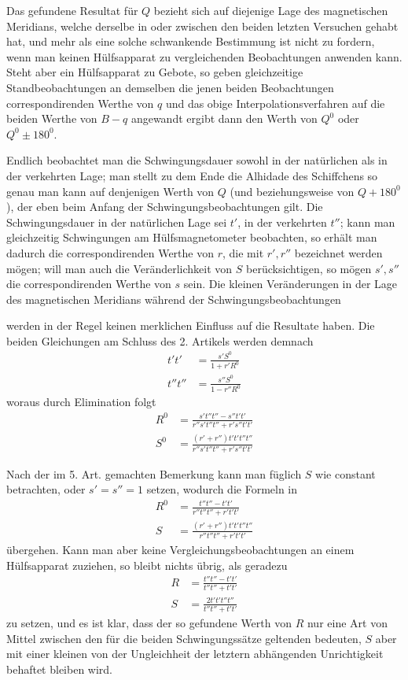 Das gefundene Resultat für $Q$ bezieht sich auf diejenige Lage des magnetischen Meridians, welche derselbe in oder zwischen den beiden letzten Versuchen gehabt hat, und mehr als eine solche schwankende Bestimmung ist nicht zu fordern, wenn man keinen Hülfsapparat zu vergleichenden Beobachtungen anwenden kann. Steht aber ein Hülfsapparat zu Gebote, so geben gleichzeitige Standbeobachtungen an demselben die jenen beiden Beobachtungen correspondirenden Werthe von $q$ und das obige Interpolationsverfahren auf die beiden Werthe von $B-q$ angewandt ergibt dann den Werth von $Q^0$ oder $Q^0\pm180^0$.

Endlich beobachtet man die Schwingungsdauer sowohl in der natürlichen als in der verkehrten Lage; man stellt zu dem Ende die Alhidade des Schiffchens so genau man kann auf denjenigen Werth von $Q$ (und beziehungsweise von $Q+180^0$), der eben beim Anfang der Schwingungsbeobachtungen gilt. Die Schwingungsdauer in der natürlichen Lage sei $t'$, in der verkehrten $t''$; kann man gleichzeitig Schwingungen am Hülfsmagnetometer beobachten, so erhält man dadurch die correspondirenden Werthe von $r$, die mit $r',r''$ bezeichnet werden mögen; will man auch die Veränderlichkeit von $S$ berücksichtigen, so mögen $s',s''$ die correspondirenden Werthe von $s$ sein. Die kleinen Veränderungen in der Lage des magnetischen Meridians während der Schwingungsbeobachtungen
\par\clearpage
{}
\noindent werden in der Regel keinen merklichen Einfluss auf die Resultate haben. Die beiden Gleichungen am Schluss des 2. Artikels werden demnach
\[
\begin{aligned}
t't'&=\frac{s'S^0}{1+r'R^0}\\
t''t''&=\frac{s''S^0}{1-r''R^0}
\end{aligned}
\]
woraus durch Elimination folgt
\[
\begin{aligned}
R^0&=\frac{s't''t''-s''t't'}{r''s't''t''+r's''t't'}\\
S^0&=\frac{(r'+r'')t't't''t''}{r''s't''t''+r's''t't'}
\end{aligned}
\]

Nach der im 5. Art. gemachten Bemerkung kann man füglich $S$ wie constant betrachten, oder $s'=s''=1$ setzen, wodurch die Formeln in
\[
\begin{aligned}
R^0&=\frac{t''t''-t't'}{r''t''t''+r't't'}\\
S&=\frac{(r'+r'')t't't''t''}{r''t''t''+r't't'}
\end{aligned}
\]
übergehen. Kann man aber keine Vergleichungsbeobachtungen an einem Hülfsapparat zuziehen, so bleibt nichts übrig, als geradezu
\[
\begin{aligned}
R&=\frac{t''t''-t't'}{t''t''+t't'}\\
S&=\frac{2t't't''t''}{t''t''+t't'}
\end{aligned}
\]
zu setzen, und es ist klar, dass der so gefundene Werth von $R$ nur eine Art von Mittel zwischen den für die beiden Schwingungssätze geltenden bedeuten, $S$ aber mit einer kleinen von der Ungleichheit der letztern abhängenden Unrichtigkeit behaftet bleiben wird.

